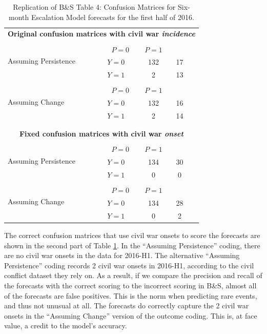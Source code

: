 \documentclass[
]{article}
\begin{document}
\begin{table}
\caption{Replication of B\&S Table 4: Confusion Matrices for Six-month Escalation Model forecasts for the first half of 2016.}\label{tab:table4}
\centering
\begin{tabular}{ll|c|c|l}
\multicolumn{5}{c}{\textbf{Original confusion matrices with civil war \textit{incidence}}} \\
\multicolumn{1}{l}{\multirow{4}{*}{Assuming Persistence}} & \multicolumn{3}{c}{} \\
\multicolumn{2}{c}{}& \multicolumn{1}{c}{$P=0$} & \multicolumn{1}{c}{$P=1$} \\
\cline{3-4}
& $Y=0$ & 132 & 17 \\
\cline{3-4}
& $Y=1$ & 2 & 13 \\
\cline{3-4}
\multicolumn{1}{l}{\multirow{4}{*}{Assuming Change}} & \multicolumn{3}{c}{} \\
\multicolumn{2}{c}{}& \multicolumn{1}{c}{$P=0$} & \multicolumn{1}{c}{$P=1$} \\
\cline{3-4}
& $Y=0$ & 132 & 16 \\
\cline{3-4}
& $Y=1$ & 2 & 14 \\
\cline{3-4}
\\ \midrule
\\
\multicolumn{5}{c}{\textbf{Fixed confusion matrices with civil war \textit{onset}}} \\
\multicolumn{1}{l}{\multirow{4}{*}{Assuming Persistence}} & \multicolumn{3}{c}{} \\
\multicolumn{2}{c}{}& \multicolumn{1}{c}{$P=0$} & \multicolumn{1}{c}{$P=1$} \\
\cline{3-4}
& $Y=0$ & 134 & 30 \\
\cline{3-4}
& $Y=1$ & 0 & 0 \\
\cline{3-4}
\multicolumn{1}{l}{\multirow{4}{*}{Assuming Change}} & \multicolumn{3}{c}{} \\
\multicolumn{2}{c}{}& \multicolumn{1}{c}{$P=0$} & \multicolumn{1}{c}{$P=1$} \\
\cline{3-4}
& $Y=0$ & 134 & 28 \\
\cline{3-4}
& $Y=1$ & 0 & 2 \\
\cline{3-4}
\end{tabular}
\end{table}

The correct confusion matrices that use civil war onsets to score the forecasts are shown in the second part of Table \ref{tab:table4}. In the ``Assuming Persistence'' coding, there are no civil war onsets in the data for 2016-H1. The alternative ``Assuming Persistence'' coding records 2 civil war onsets in 2016-H1, according to the civil conflict dataset they rely on. As a result, if we compare the precision and recall of the forecasts with the correct scoring to the incorrect scoring in B\&S, almost all of the forecasts are false positives. This is the norm when predicting rare events, and thus not unusual at all. The forecasts do correctly capture the 2 civil war onsets in the ``Assuming Change'' version of the outcome coding. This is, at face value, a credit to the model's accuracy.
\end{document}
